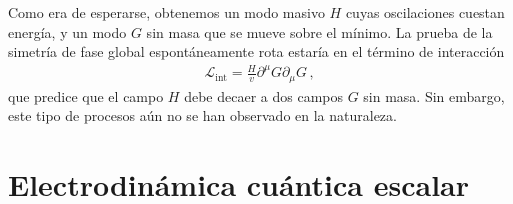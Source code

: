 Como era de esperarse, obtenemos un modo masivo $H$ cuyas oscilaciones cuestan energía, y un modo $G$ sin masa que se mueve sobre el mínimo. La prueba de la simetría de fase global espontáneamente rota estaría en el término de interacción
\begin{align}
  \mathcal{L}_{\text{int}}=\frac{H}{v}\partial^{\mu}G\partial_{\mu}G\,,
\end{align}
que predice que el campo $H$ debe decaer a dos campos $G$ sin masa. Sin embargo, este tipo de procesos aún no se han observado en la naturaleza. 

\section{Electrodinámica cuántica escalar}


